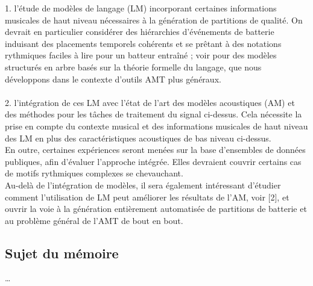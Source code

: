 1. l'étude de modèles de langage (LM) incorporant certaines informations musicales de haut niveau nécessaires à la génération de partitions de qualité. On devrait en particulier considérer des hiérarchies d'événements de batterie induisant des placements temporels cohérents et se prêtant à des notations rythmiques faciles à lire pour un batteur entraîné ; voir \cite{foscarin:hal-01988990} pour des modèles structurés en arbre basés sur la théorie formelle du langage, que nous développons dans le contexte d'outils AMT plus généraux.\\\\
2. l'intégration de ces LM avec l'état de l'art des modèles acoustiques (AM) et des méthodes pour les tâches de traitement du signal ci-dessus. Cela nécessite la prise en compte du contexte musical et des informations musicales de haut niveau des LM en plus des caractéristiques acoustiques de bas niveau ci-dessus.\\
En outre, certaines expériences seront menées sur la base d'ensembles de données publiques, afin d'évaluer l'approche intégrée. Elles devraient couvrir certains cas de motifs rythmiques complexes se chevauchant.\\

Au-delà de l'intégration de modèles, il sera également intéressant d'étudier comment l'utilisation de LM peut améliorer les résultats de l'AM, voir [2], et ouvrir la voie à la génération entièrement automatisée de partitions de batterie et au problème général de l'AMT de bout en bout.
\cite{8350302}
\subsection*{Sujet du mémoire}
…
